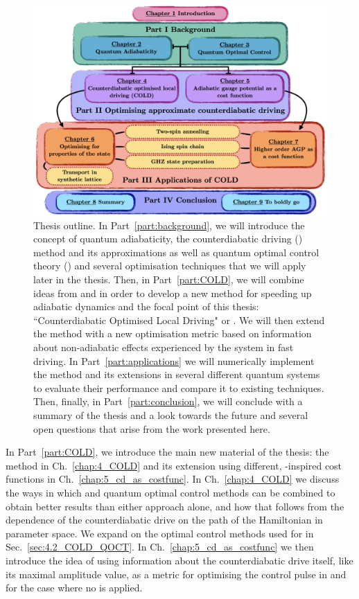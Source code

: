 \begin{figure}[t!]
    \centering
    \includegraphics[width=\linewidth]{images/thesis_overview.png} \caption[Thesis outline.]{Thesis outline. In Part~\ref{part:background}, we will introduce the concept of quantum adiabaticity, the counterdiabatic driving () method and its approximations as well as quantum optimal control theory () and several optimisation techniques that we will apply later in the thesis. Then, in Part~\ref{part:COLD}, we will combine ideas from  and  in order to develop a new method for speeding up adiabatic dynamics and the focal point of this thesis: ``Counterdiabatic Optimised Local Driving" or . We will then extend the method with a new optimisation metric based on information about non-adiabatic effects experienced by the system in fast driving. In Part~\ref{part:applications} we will numerically implement the  method and its extensions in several different quantum systems to evaluate their performance and compare it to existing techniques. Then, finally, in Part~\ref{part:conclusion}, we will conclude with a summary of the thesis and a look towards the future and several open questions that arise from the work presented here.}\label{fig:thesis_overview}
\end{figure}

In Part~\ref{part:COLD}, we introduce the main new material of the thesis: the  method in Ch.~\ref{chap:4_COLD} and its extension using different, -inspired cost functions in Ch.~\ref{chap:5_cd_as_costfunc}. In Ch.~\ref{chap:4_COLD} we discuss the ways in which  and quantum optimal control methods can be combined to obtain better results than either approach alone, and how that follows from the dependence of the counterdiabatic drive on the path of the Hamiltonian in parameter space. We expand on the optimal control methods used for  in Sec.~\ref{sec:4.2_COLD_QOCT}. In Ch.~\ref{chap:5_cd_as_costfunc} we then introduce the idea of using information about the counterdiabatic drive itself, like its maximal amplitude value, as a metric for optimising the control pulse in  and for the case where no  is applied.

